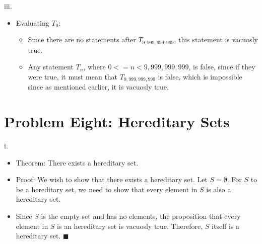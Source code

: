 \documentclass{article}
\renewcommand{\(}{\left(}
\renewcommand{\)}{\right)}
\theoremstyle{plain}
\theoremstyle{plain}
\theoremstyle{definition}
\begin{document}
    iii.
    \begin{shaded}
        \begin{itemize}
            \item
                Evaluating $T_{0}$:
                    \begin{itemize}
                        \item 
                            Since there are no statements after $T_{9,999,999,999}$, this statement is vacuosly true.
                        \item 
                            Any statement $T_{n}$, where $0<=n<9,999,999,999$, is false, since if they were true, it must mean that $T_{9,999,999,999}$ is false, which is impossible since as mentioned earlier, it is vacuosly true.
                    \end{itemize}
        \end{itemize}
    \end{shaded}

\newpage

\section*{Problem Eight: Hereditary Sets}
    i.
    \begin{shaded}
        \begin{itemize}
            \item 
                Theorem: There exists a hereditary set.
            \item 
                Proof: We wish to show that there exists a hereditary set. Let $S=\emptyset$. For $S$ to be a hereditary set, we need to show that every element in $S$ is also a hereditary set.
            \item 
                Since $S$ is the empty set and has no elements, the proposition that every element in $S$ is an hereditary set is vacuosly true. Therefore, $S$ itself is a hereditary set. $\blacksquare$
        \end{itemize}
    \end{shaded}
        
\end{document}
